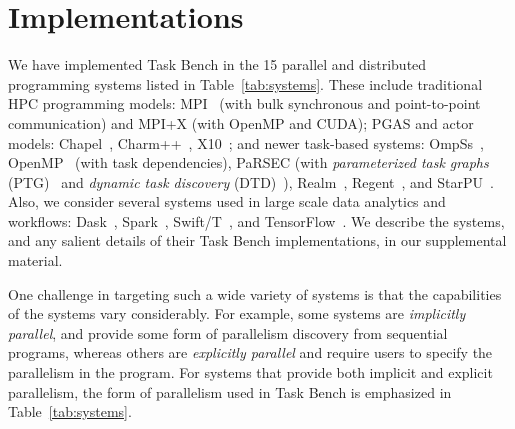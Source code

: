 \section{Implementations}
\label{sec:implementation}



We have implemented Task Bench in the 15 parallel and distributed
programming systems listed in Table~\ref{tab:systems}. These include
traditional HPC programming models: MPI~\cite{MPI} (with bulk
synchronous and point-to-point communication) and MPI+X (with OpenMP
and CUDA); PGAS and actor models: Chapel~\cite{Chapel15},
Charm++~\cite{Charmpp93}, X10~\cite{X1005}; and newer task-based
systems: OmpSs~\cite{OmpSs11}, OpenMP~\cite{OpenMPSpec40} (with task
dependencies), PaRSEC (with \emph{parameterized task graphs}
(PTG)~\cite{PARSEC13} and \emph{dynamic task discovery}
(DTD)~\cite{PARSEC_DTD}), Realm~\cite{Realm14},
Regent~\cite{Regent15}, and StarPU~\cite{StarPU11}. Also, we consider
several systems used in large scale data analytics and workflows:
Dask~\cite{Dask15}, Spark~\cite{Spark10}, Swift/T~\cite{Wozniak13},
and TensorFlow~\cite{TensorFlow15}. We describe the systems, and any
salient details of their Task Bench implementations, in our
supplemental material.

One challenge in targeting such a wide variety of
systems is that the capabilities of the systems vary considerably. For
example, some systems are \emph{implicitly parallel}, and provide some
form of parallelism discovery from sequential programs, whereas others
are \emph{explicitly parallel} and require users to specify the
parallelism in the program. For systems that provide both implicit and explicit parallelism, the form of parallelism used in Task Bench is emphasized in Table~\ref{tab:systems}.



